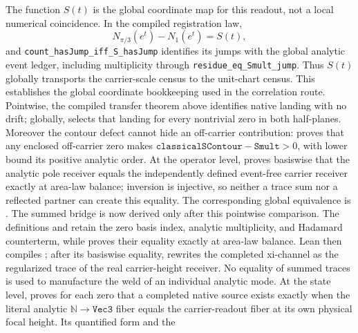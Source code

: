 \documentclass[11pt]{article}
\theoremstyle{definition}
\begin{document}
The function \(S(t)\) is the global coordinate map for this readout, not a
local numerical coincidence.  In the compiled registration law,
\[
 N_{\pi/3}(e^t)-N_1(e^t)=S(t),
\]
and \texttt{count\_hasJump\_iff\_S\_hasJump} identifies its jumps with the
global analytic event ledger, including multiplicity through
\texttt{residue\_eq\_Smult\_jump}.  Thus \(S(t)\) globally transports the
carrier-scale census to the unit-chart census.  This establishes the global
coordinate bookkeeping used in the correlation route.  Pointwise, the
compiled transfer theorem above identifies native landing with no drift;
globally,  selects that
landing for every nontrivial zero in both half-planes.
Moreover the contour defect cannot hide an off-carrier contribution:
 proves that any enclosed
off-carrier zero makes
\(\texttt{classicalSContour}-\texttt{Smult}>0\), with lower bound its positive
analytic order.  At the operator level,
 proves
basiswise that the analytic pole receiver equals the independently defined
event-free carrier receiver exactly at area-law balance; inversion is
injective, so neither a trace sum nor a reflected partner can create this
equality.  The corresponding global equivalence is
.
The summed bridge is now derived only after this pointwise comparison.  The
definitions  and
 retain the zero basis index, analytic
multiplicity, and Hadamard counterterm, while
 proves
their equality exactly at area-law balance.  Lean then compiles
;
after its basiswise equality,
 rewrites
the completed xi-channel as the regularized trace of the real carrier-height
receiver.  No equality of summed traces is used to manufacture the weld of an
individual analytic mode.
At the state level,
proves for each zero that a completed native source exists exactly when the
literal analytic \(\mathbb N\to\texttt{Vec3}\) fiber equals the carrier-readout
fiber at its own physical focal height.  Its quantified form
 and the
\end{document}
